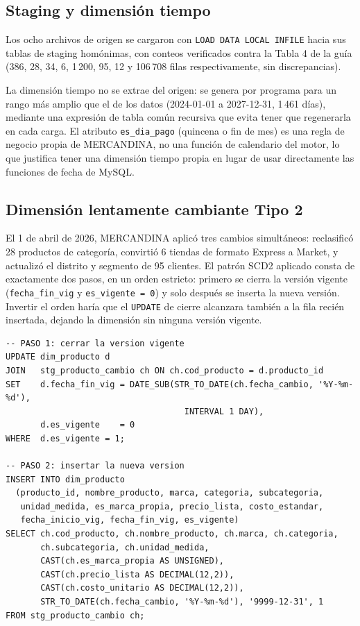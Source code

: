 \documentclass[11pt,a4paper]{article}
\begin{document}
\subsection{Staging y dimensión tiempo}

Los ocho archivos de origen se cargaron con \texttt{LOAD DATA LOCAL INFILE} hacia sus tablas de staging homónimas, con conteos verificados contra la Tabla 4 de la guía (386, 28, 34, 6, 1\,200, 95, 12 y 106\,708 filas respectivamente, sin discrepancias).

La dimensión tiempo no se extrae del origen: se genera por programa para un rango más amplio que el de los datos (2024-01-01 a 2027-12-31, 1\,461 días), mediante una expresión de tabla común recursiva que evita tener que regenerarla en cada carga. El atributo \texttt{es\_dia\_pago} (quincena o fin de mes) es una regla de negocio propia de MERCANDINA, no una función de calendario del motor, lo que justifica tener una dimensión tiempo propia en lugar de usar directamente las funciones de fecha de MySQL.

\subsection{Dimensión lentamente cambiante Tipo 2}

El 1 de abril de 2026, MERCANDINA aplicó tres cambios simultáneos: reclasificó 28 productos de categoría, convirtió 6 tiendas de formato Express a Market, y actualizó el distrito y segmento de 95 clientes. El patrón SCD2 aplicado consta de exactamente dos pasos, en un orden estricto: primero se cierra la versión vigente (\texttt{fecha\_fin\_vig} y \texttt{es\_vigente = 0}) y solo después se inserta la nueva versión. Invertir el orden haría que el \texttt{UPDATE} de cierre alcanzara también a la fila recién insertada, dejando la dimensión sin ninguna versión vigente.

\begin{lstlisting}[caption={Patrón SCD Tipo 2 de dos pasos aplicado a \texttt{dim\_producto} (\texttt{dm\_mercandina\_scd2.sql}).}, label={lst:scd2}]
-- PASO 1: cerrar la version vigente
UPDATE dim_producto d
JOIN   stg_producto_cambio ch ON ch.cod_producto = d.producto_id
SET    d.fecha_fin_vig = DATE_SUB(STR_TO_DATE(ch.fecha_cambio, '%Y-%m-%d'),
                                    INTERVAL 1 DAY),
       d.es_vigente    = 0
WHERE  d.es_vigente = 1;

-- PASO 2: insertar la nueva version
INSERT INTO dim_producto
  (producto_id, nombre_producto, marca, categoria, subcategoria,
   unidad_medida, es_marca_propia, precio_lista, costo_estandar,
   fecha_inicio_vig, fecha_fin_vig, es_vigente)
SELECT ch.cod_producto, ch.nombre_producto, ch.marca, ch.categoria,
       ch.subcategoria, ch.unidad_medida,
       CAST(ch.es_marca_propia AS UNSIGNED),
       CAST(ch.precio_lista AS DECIMAL(12,2)),
       CAST(ch.costo_unitario AS DECIMAL(12,2)),
       STR_TO_DATE(ch.fecha_cambio, '%Y-%m-%d'), '9999-12-31', 1
FROM stg_producto_cambio ch;
\end{lstlisting}
\end{document}
